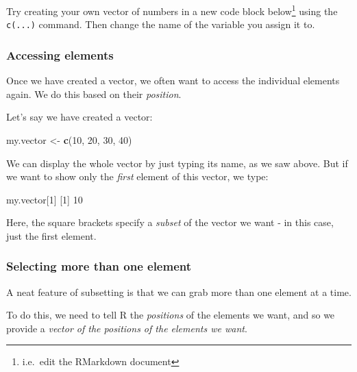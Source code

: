\documentclass[]{article}
\newenvironment{Shaded}{\begin{snugshade}}{\end{snugshade}}
\newcommand{\DecValTok}[1]{\textcolor[rgb]{0.00,0.00,0.81}{#1}}
\newcommand{\KeywordTok}[1]{\textcolor[rgb]{0.13,0.29,0.53}{\textbf{#1}}}
\newcommand{\NormalTok}[1]{#1}
\newcommand{\StringTok}[1]{\textcolor[rgb]{0.31,0.60,0.02}{#1}}
\let\rmarkdownfootnote\footnote%
\def\footnote{\protect\rmarkdownfootnote}
\begin{document}
Try creating your own vector of numbers in a new code block below\footnote{i.e.~edit the
  RMarkdown document} using the \texttt{c(...)} command. Then change the name of the
variable you assign it to.

\hypertarget{access-vector-elements}{%
\subsubsection*{Accessing elements}\label{access-vector-elements}}

Once we have created a vector, we often want to access the individual elements
again. We do this based on their \emph{position}.

Let's say we have created a vector:

\begin{Shaded}
\begin{Highlighting}[]
\NormalTok{my.vector <-}\StringTok{ }\KeywordTok{c}\NormalTok{(}\DecValTok{10}\NormalTok{, }\DecValTok{20}\NormalTok{, }\DecValTok{30}\NormalTok{, }\DecValTok{40}\NormalTok{)}
\end{Highlighting}
\end{Shaded}

We can display the whole vector by just typing its name, as we saw above. But if
we want to show only the \emph{first} element of this vector, we type:

\begin{Shaded}
\begin{Highlighting}[]
\NormalTok{my.vector[}\DecValTok{1}\NormalTok{]}
\NormalTok{[}\DecValTok{1}\NormalTok{] }\DecValTok{10}
\end{Highlighting}
\end{Shaded}

Here, the square brackets specify a \emph{subset} of the vector we want - in this
case, just the first element.

\hypertarget{selecting-more-than-one-element}{%
\subsubsection*{Selecting more than one element}\label{selecting-more-than-one-element}}

A neat feature of subsetting is that we can grab more than one element at a
time.

To do this, we need to tell R the \emph{positions} of the elements we want, and so we
provide a \emph{vector of the positions of the elements we want}.
\end{document}
